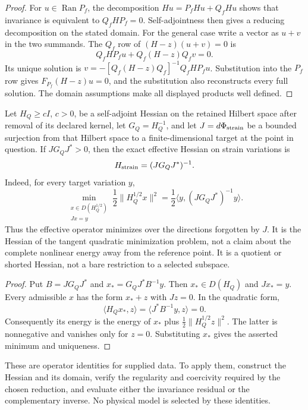 \documentclass[11pt]{article}
\begin{document}
\begin{proof}
For $u\in\operatorname{Ran}P_f$, the decomposition
$Hu=P_fHu+Q_fHu$ shows that invariance is equivalent to $Q_fHP_f=0$.
Self-adjointness then gives a reducing decomposition on the stated domain.
For the general case write a vector as $u+v$ in the two summands. The
$Q_f$ row of $(H-z)(u+v)=0$ is
\[
Q_fHP_fu+Q_f(H-z)Q_fv=0.
\]
Its unique solution is
$v=-[Q_f(H-z)Q_f]^{-1}Q_fHP_fu$. Substitution into the $P_f$ row gives
$F_{P_f}(H-z)u=0$, and the substitution also reconstructs every full solution.
The domain assumptions make all displayed products well defined.
\end{proof}

\begin{theorem}\label{thm:shorted-hessian}
Let $H_Q\ge cI$, $c>0$, be a self-adjoint Hessian on the retained Hilbert
space after removal of its declared kernel, let $G_Q=H_Q^{-1}$, and let
$J=d\Phi_{\rm strain}$ be a bounded surjection from that Hilbert space to a
finite-dimensional target at the point in question. If $JG_QJ^\ast>0$,
then the exact effective Hessian on strain variations is
\[
H_{\rm strain}=(JG_QJ^\ast)^{-1}.
\]
Indeed, for every target variation $y$,
\[
\min_{\substack{x\in D(H_Q^{1/2})\\Jx=y}}
\frac12\|H_Q^{1/2}x\|^2
=\frac12\langle y,(JG_QJ^\ast)^{-1}y\rangle.
\]
Thus the effective operator minimizes over the directions forgotten by $J$.
It is the Hessian of the tangent quadratic minimization problem, not a claim
about the complete nonlinear energy away from the reference point. It is a
quotient or shorted Hessian, not a bare restriction to a selected subspace.
\end{theorem}

\begin{proof}
Put $B=JG_QJ^\ast$ and $x_\ast=G_QJ^\ast B^{-1}y$. Then
$x_\ast\in D(H_Q)$ and $Jx_\ast=y$. Every admissible $x$ has the form
$x_\ast+z$ with $Jz=0$. In the quadratic form,
\[
\langle H_Qx_\ast,z\rangle
=\langle J^\ast B^{-1}y,z\rangle=0.
\]
Consequently its energy is the energy of $x_\ast$ plus
$\frac12\|H_Q^{1/2}z\|^2$. The latter is nonnegative and vanishes only
for $z=0$. Substituting $x_\ast$ gives the asserted minimum and uniqueness.
\end{proof}

These are operator identities for supplied data. To apply them, construct the
Hessian and its domain, verify the regularity and coercivity required by the
chosen reduction, and evaluate either the invariance residual or the
complementary inverse. No physical model is selected by these identities.
\end{document}

